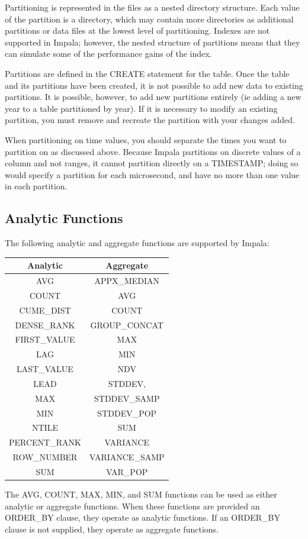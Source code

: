 \documentclass[onecolumn, draftclsnofoot,10pt, compsoc]{IEEEtran}
\begin{document}
Partitioning is represented in the files as a nested directory structure. 
Each value of the partition is a directory, which may contain more directories as additional partitions or data files at the lowest level of partitioning. 
Indexes are not supported in Impala; however, the nested structure of partitions means that they can simulate some of the performance gains of the index.

Partitions are defined in the CREATE statement for the table. 
Once the table and its partitions have been created, it is not possible to add new data to existing partitions. 
It is possible, however, to add new partitions entirely (ie adding a new year to a table partitioned by year).
If it is necessary to modify an existing partition, you must remove and recreate the partition with your changes added. 

When partitioning on time values, you should separate the times you want to partition on as discussed above.
Because Impala partitions on discrete values of a column and not ranges, it cannot partition directly on a TIMESTAMP; doing so would specify a partition for each microsecond, and have no more than one value in each partition.

    \subsection{Analytic Functions}
The following analytic and aggregate functions are supported by Impala:
\begin{center}
\begin{tabular}{ |c|c| }
    \hline
    Analytic & Aggregate \\
    \hline
    AVG & APPX\_MEDIAN \\
    COUNT & AVG \\
    CUME\_DIST & COUNT \\
    DENSE\_RANK & GROUP\_CONCAT \\
    FIRST\_VALUE & MAX \\
    LAG & MIN \\
    LAST\_VALUE & NDV \\
    LEAD & STDDEV,  \\
    MAX & STDDEV\_SAMP \\
    MIN & STDDEV\_POP \\
    NTILE & SUM \\
    PERCENT\_RANK & VARIANCE \\
    ROW\_NUMBER & VARIANCE\_SAMP\\
    SUM & VAR\_POP \\
    \hline
\end{tabular}
\end{center}
The AVG, COUNT, MAX, MIN, and SUM functions can be used as either analytic or aggregate functions. 
When these functions are provided an ORDER\_BY clause, they operate as analytic functions.
If an ORDER\_BY clause is not supplied, they operate as aggregate functions. 
\end{document}

